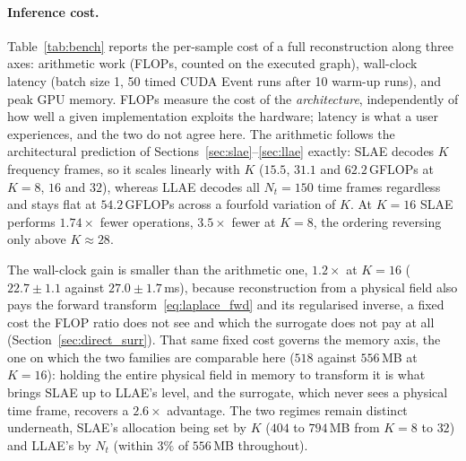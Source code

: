 ﻿\documentclass[a4paper,12pt]{article}
\theoremstyle{definition}
\theoremstyle{remark}
\begin{document}
\paragraph{Inference cost.}
Table~\ref{tab:bench} reports the per-sample cost of a full reconstruction along three axes: arithmetic work (FLOPs, counted on the executed graph), wall-clock latency (batch size 1, 50 timed CUDA Event runs after 10 warm-up runs), and peak GPU memory. FLOPs measure the cost of the \emph{architecture}, independently of how well a given implementation exploits the hardware; latency is what a user experiences, and the two do not agree here. The arithmetic follows the architectural prediction of Sections~\ref{sec:slae}--\ref{sec:llae} exactly: SLAE decodes $K$ frequency frames, so it scales linearly with $K$ ($15.5$, $31.1$ and $62.2$\,GFLOPs at $K=8$, $16$ and $32$), whereas LLAE decodes all $N_t=150$ time frames regardless and stays flat at $54.2$\,GFLOPs across a fourfold variation of $K$. At $K=16$ SLAE performs $1.74\times$ fewer operations, $3.5\times$ fewer at $K=8$, the ordering reversing only above $K \approx 28$.

The wall-clock gain is smaller than the arithmetic one, $1.2\times$ at $K=16$ ($22.7 \pm 1.1$ against $27.0 \pm 1.7$\,ms), because reconstruction from a physical field also pays the forward transform~\eqref{eq:laplace_fwd} and its regularised inverse, a fixed cost the FLOP ratio does not see and which the surrogate does not pay at all (Section~\ref{sec:direct_surr}). That same fixed cost governs the memory axis, the one on which the two families are comparable here ($518$ against $556$\,MB at $K=16$): holding the entire physical field in memory to transform it is what brings SLAE up to LLAE's level, and the surrogate, which never sees a physical time frame, recovers a $2.6\times$ advantage. The two regimes remain distinct underneath, SLAE's allocation being set by $K$ ($404$ to $794$\,MB from $K=8$ to $32$) and LLAE's by $N_t$ (within $3\%$ of $556$\,MB throughout).
\end{document}
